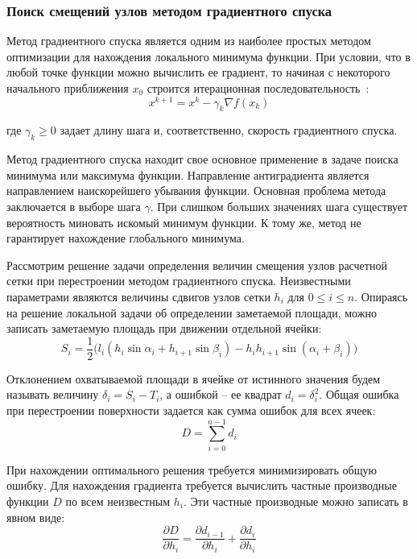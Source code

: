\subsubsection{Поиск смещений узлов методом градиентного спуска}

Метод градиентного спуска\label{term:gradient_spusk} является одним из наиболее простых методом оптимизации для нахождения локального минимума функции.
При условии, что в любой точке функции можно вычислить ее градиент, то начиная с некоторого начального приближения $x_0$ строится итерационная последовательность~\cite{Kantorovich1984Func}:
\begin{equation}
x^{k+1} = x^k - \gamma_k \nabla f(x_k)
\end{equation}

где $\gamma_k \ge 0$ задает длину шага и, соответственно, скорость градиентного спуска.

Метод градиентного спуска находит свое основное применение в задаче поиска минимума или максимума функции.
Направление антиградиента является направлением наискорейшего убывания функции.
Основная проблема метода заключается в выборе шага $\gamma$.
При слишком больших значениях шага существует вероятность миновать искомый минимум функции.
К тому же, метод не гарантирует нахождение глобального минимума.

Рассмотрим решение задачи определения величин смещения узлов расчетной сетки при перестроении методом градиентного спуска.
Неизвестными параметрами являются величины сдвигов узлов сетки $h_i$ для $0 \le i \le n$.
Опираясь на решение локальной задачи об определении заметаемой площади, можно записать заметаемую площадь при движении отдельной ячейки:
\begin{equation}
S_i = \frac{1}{2}\big(l_i(h_i \sin \alpha_i + h_{i + 1} \sin \beta_i) - h_ih_{i + 1} \sin(\alpha_i + \beta_i)\big) 
\end{equation}

Отклонением охватываемой площади в ячейке от истинного значения будем называть величину $\delta_i = S_i - T_i$, а ошибкой -- ее квадрат $d_i = \delta_i^2$.
Общая ошибка при перестроении поверхности задается как сумма ошибок для всех ячеек:
\begin{equation}
D = \sum_{i = 0}^{n - 1}{d_i}
\end{equation}

При нахождении оптимального решения требуется минимизировать общую ошибку.
Для нахождения градиента требуется вычислить частные производные функции $D$ по всем неизвестным $h_i$.
Эти частные производные можно записать в явном виде:
\begin{equation}
\frac{\partial D}{\partial h_i} = \frac{\partial d_{i - 1}}{\partial h_i} + \frac{\partial d_i}{\partial h_i}
\end{equation}

